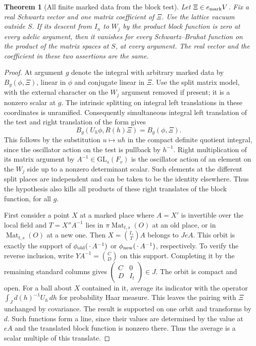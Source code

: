 \documentclass[a4paper,11pt]{article}
\newtheorem{theorem}[proposition]{Theorem}
\theoremstyle{definition}
\theoremstyle{remark}
\numberwithin{equation}{section}
\begin{document}
\begin{theorem}[All finite marked data from the block test]
\leavevmode\label{thm:markedbottom847}
Let \(\Xi\in e_{\rm mark}V\). Fix a real Schwartz vector and
one matrix coefficient of \(\Xi\). Use the lattice vacuum
outside \(S\). If its descent from \(I_n\) to \(W_j\) by the
product block function is zero at every adelic argument, then
it vanishes for every Schwartz--Bruhat function on the product
of the matrix spaces at \(S\), at every argument. The real
vector and the coefficient in these two assertions are the same.
\end{theorem}
\begin{proof}
At argument \(g\) denote the integral with arbitrary marked
data by \(B_g(\phi,\Xi)\), linear in \(\phi\) and conjugate
linear in \(\Xi\). Use the split matrix model, with the external
character on the \(W_j\) argument removed if present; it is a
nonzero scalar at \(g\). The intrinsic splitting on integral
left translations in these coordinates is unramified.
Consequently simultaneous integral left translation of the test
and right translation of the form gives
\[
              B_g(U_h\phi,R(h)\Xi)=B_g(\phi,\Xi).
\]
This follows by the substitution \(u\mapsto uh\) in the compact
definite quotient integral, since the oscillator action on the
test is pullback by \(h^{-1}\). Right multiplication of its matrix
argument by \(A^{-1}\in\mathrm{GL}_s(F_v)\) is the oscillator
action of an element on the \(W_j\) side up to a nonzero
determinant scalar. Such elements at the different split places
are independent and can be taken to be the identity elsewhere.
Thus the hypothesis also kills all products of these right
translates of the block function, for all \(g\).

First consider a point \(X\) at a marked place where \(A=X'\)
is invertible over the local field and \(T=X''A^{-1}\) lies
in \(\pi\operatorname{Mat}_{t,s}(O)\) at an old place, or
in \(\operatorname{Mat}_{t,s}(O)\) at a new one. Then
\(X=\binom{I_s}{T}A\) belongs to \(J eA\). This orbit is exactly
the support of \(\phi_{\rm old}(\,\cdot\, A^{-1})\) or
\(\phi_{\rm new}(\,\cdot\, A^{-1})\), respectively. To verify
the reverse inclusion, write \(Y A^{-1}=\binom{C}{D}\) on this
support. Completing it by the remaining standard columns gives
\(\left(\begin{smallmatrix}C&0\\D&I_t\end{smallmatrix}\right)\in J\).
The orbit is compact and open. For a ball about \(X\) contained
in it, average its indicator with the operator
\(\int_J d(h)^{-1}U_h\,dh\) for probability Haar measure.
This leaves the pairing with \(\Xi\) unchanged by covariance.
The result is supported on one orbit and transforms by \(d\).
Such functions form a line, since their values are determined by
the value at \(eA\) and the translated block function is nonzero
there. Thus the average is a scalar multiple of this translate.


\end{proof}
\end{document}
